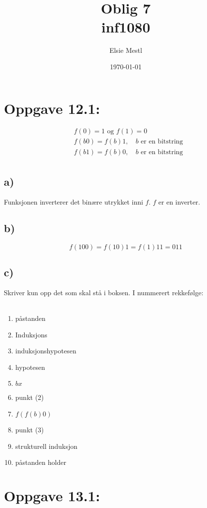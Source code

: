 \documentclass[a4paper, norsk, 10pt]{article}
\date{\today}
\title{Oblig 7 \\ inf1080}
\author{Elsie Mestl}
\begin{document}
\maketitle
\begin{flushleft}

  \section*{Oppgave 12.1:}

  \begin{align*}
    &f(0) = 1 \text{ og } f(1) = 0 \\
    &f(b0) = f(b)1, \quad \text{$b$ er en bitstring} \\
    &f(b1) = f(b)0, \quad \text{$b$ er en bitstring} \\
  \end{align*}

  \subsection*{a)}
  Funksjonen inverterer det binære utrykket inni $f$. $f$ er en inverter.

  \subsection*{b)}
  \[f(100) = f(10)1 = f(1)11 = 011 \]

  \subsection*{c)}
  Skriver kun opp det som skal stå i boksen. I nummerert rekkefølge: \\ \ \\
  \begin{enumerate}
  \item påstanden
  \item Induksjons
  \item induksjonshypotesen
  \item hypotesen
  \item $bx$
  \item punkt (2)
  \item $f(f(b)0)$
  \item punkt (3)
  \item strukturell induksjon
  \item påstanden holder
  \end{enumerate}


  \section*{Oppgave 13.1:}
  

\end{flushleft}
\end{document}

